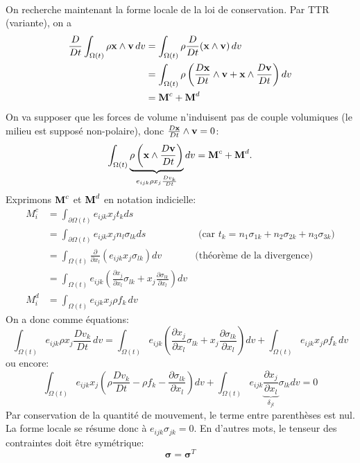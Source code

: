 \paragraph{}
On recherche maintenant la forme locale de la loi de conservation. Par TTR (variante), on a
$$\begin{aligned}
\frac{D}{Dt}\int_{\Omega (t)}\rho\textbf{x}\wedge\textbf{v}\,dv &=\int_{\Omega (t)}\rho\frac{D}{Dt}(\textbf{x}\wedge\textbf{v})\,dv\\
 &=\int_{\Omega (t)}\rho \left(\frac{D\textbf{x}}{Dt}\wedge\textbf{v}+\textbf{x}\wedge\frac{D\textbf{v}}{Dt}\right)dv\\
  & =\textbf{M}^c+\textbf{M}^d\\
\end{aligned}$$
On va supposer que les forces de volume  n'induisent pas de couple volumiques (le milieu est supposé non-polaire), donc $\frac{D\textbf{x}}{Dt}\wedge\textbf{v}=0$:
$$\int_{\Omega (t)}\underbrace{\rho \left(\textbf{x}\wedge\frac{D\textbf{v}}{Dt}\right)}_{e_{ijk}\rho x_j\frac{Dv_k}{Dt}}dv=\textbf{M}^c+\textbf{M}^d.$$
Exprimons $\textbf{M}^c$ et $\textbf{M}^d$ en notation indicielle:
$$\begin{aligned}
M_i^c&=\int_{\partial\Omega (t)}e_{ijk}x_jt_kds\\
 & =\int_{\partial\Omega (t)}e_{ijk}x_jn_l\sigma_{lk}ds & \text{  (car } t_k=n_1\sigma_{1k}+n_2\sigma_{2k}+n_3\sigma_{3k}\text{)}\\
 &=\int_{\Omega (t)}\frac{\partial}{\partial x_l}(e_{ijk}x_j\sigma_{lk})dv& \text{(théorème de la divergence)}\\
 &=\int_{\Omega (t)}e_{ijk}\left(\frac{\partial x_j}{\partial x_l}\sigma_{lk}+x_j\frac{\partial\sigma_{lk}}{\partial x_l}\right)dv\\
 M_i^d&=\int_{\Omega (t)}e_{ijk}x_j\rho f_k\,dv
\end{aligned}$$
On a donc comme équations:
$$\int_{\Omega (t)}e_{ijk}\rho x_j\frac{Dv_k}{Dt}\,dv=\int_{\Omega (t)}e_{ijk}\left(\frac{\partial x_j}{\partial x_l}\sigma_{lk}+x_j\frac{\partial\sigma_{lk}}{\partial x_l}\right)dv+\int_{\Omega (t)}e_{ijk}x_j\rho f_k\,dv$$
ou encore:
$$\int_{\Omega (t)}e_{ijk}x_j\left(\rho\frac{Dv_k}{Dt}-\rho f_k-\frac{\partial \sigma_{lk}}{\partial x_l}\right)dv+\int_{\Omega (t)}e_{ijk}\underbrace{\frac{\partial x_j}{\partial x_l}}_{\delta_{jl}}\sigma_{lk}dv=0$$
Par conservation de la quantité de mouvement, le terme entre parenthèses est nul. La forme locale se résume donc à $e_{ijk}\sigma_{jk}=0$. En d'autres mots, le tenseur des contraintes doit être symétrique:
$$\boxed{\boldsymbol{\sigma}=\boldsymbol{\sigma}^T}$$

